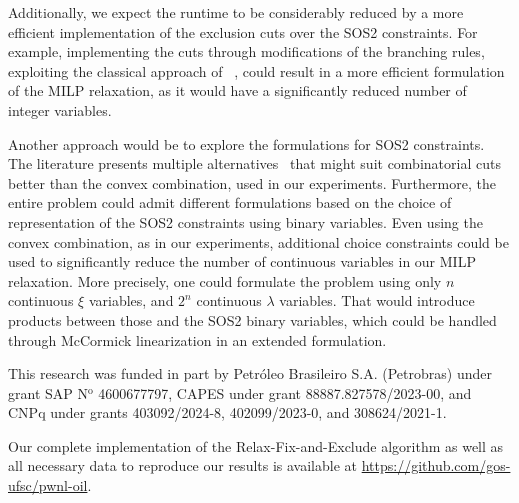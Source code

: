 \documentclass[pdflatex,sn-mathphys-num]{sn-jnl}%
\newcommand{\new}[1]{#1}
\begin{document}
Additionally, we expect the runtime to be considerably reduced by a more efficient implementation of the exclusion cuts over the SOS2 constraints.
For example, implementing the cuts through modifications of the branching rules, \new{exploiting the classical approach of \citeauthor{bealeBranchBoundMethods1979}~\cite{bealeBranchBoundMethods1979}}, could result in a more efficient formulation of the MILP relaxation, as it would have a significantly reduced number of integer variables.

\new{%
Another approach would be to explore the formulations for SOS2 constraints.
The literature presents multiple alternatives~\citep{vielma2010modeling,Silva:EJOR:2014} that might suit combinatorial cuts better than the convex combination, used in our experiments.
Furthermore, the entire problem could admit different formulations based on the choice of representation of the SOS2 constraints using binary variables.
Even using the convex combination, as in our experiments, additional choice constraints could be used to significantly reduce the number of continuous variables in our MILP relaxation.
More precisely, one could formulate the problem using only $n$ continuous $\xi$ variables, and $2^n$ continuous $\lambda$ variables.
That would introduce products between those and the SOS2 binary variables, which could be handled through McCormick linearization in an extended formulation.
}

\backmatter


This research was funded in part by Petr\'oleo Brasileiro S.A. (Petrobras) under grant SAP N$^{\text{o}}$ 4600677797, CAPES under grant 88887.827578/2023-00, and CNPq under grants 403092/2024-8, 402099/2023-0, and 308624/2021-1.


Our complete implementation of the Relax-Fix-and-Exclude algorithm as well as all necessary data to reproduce our results is available at \url{https://github.com/gos-ufsc/pwnl-oil}.
\end{document}
